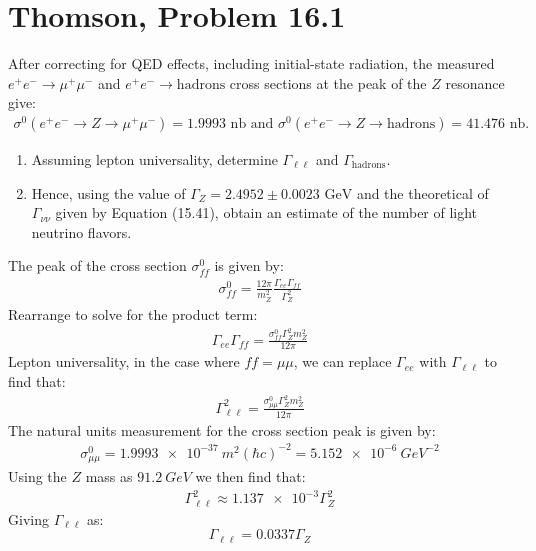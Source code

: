 \documentclass[12pt]{article}
\renewcommand{\l}{\ell}
\begin{document}
\section{Thomson, Problem 16.1}
\begin{problem}
  After correcting for QED effects, including initial-state radiation, the measured $e^+e^-\to\mu^+\mu^-$ and $e^+e^-\to\text{hadrons}$ cross sections at the peak of the $Z$ resonance give:
  \begin{align*}
    \sigma^0(e^+e^-\to Z\to \mu^+\mu^-)=1.9993\text{ nb}\,\,\text{and}\,\,
    \sigma^0(e^+e^-\to Z\to\text{hadrons})=41.476\text{ nb}.
  \end{align*}
  \begin{enumerate}[label = (\alph*)]
  \item Assuming lepton universality, determine $\Gamma_{\l\l}$ and $\Gamma_{\text{hadrons}}$.
  \item Hence, using the value of $\Gamma_Z=2.4952\pm0.0023\text{ GeV}$ and the theoretical of $\Gamma_{\nu\nu}$ given by Equation (15.41), obtain an estimate of the number of light neutrino flavors.
  \end{enumerate}
\end{problem}
The peak of the cross section $\sigma^0_{ff}$ is given by:
\begin{align*}
  \sigma^0_{ff}=\frac{12\pi}{m_Z^2}\frac{\Gamma_{ee}\Gamma_{ff}}{\Gamma_Z^2}
\end{align*}
Rearrange to solve for the product term:
\begin{align*}
  \Gamma_{ee}\Gamma_{ff}=\frac{\sigma_{ff}^0\Gamma_Z^2m_Z^2}{12\pi}
\end{align*}
Lepton universality, in the case where $ff=\mu\mu$, we can replace $\Gamma_{ee}$ with $\Gamma_{\l\l}$ to find that:
\begin{align*}
  \Gamma^2_{\l\l}=\frac{\sigma^0_{\mu\mu}\Gamma_Z^2m_Z^2}{12\pi}
\end{align*}
The natural units measurement for the cross section peak is given by:
\begin{align*}
  \sigma^0_{\mu\mu}=\SI{1.9993e-37}{m^2}(\hbar c)^{-2}=\SI{5.152e-6}{GeV^{-2}}
\end{align*}
Using the $Z$ mass as $\SI{91.2}{GeV}$ we then find that:
\begin{align*}
  \Gamma_{\l\l}^2\approx\num{1.137e-3}\Gamma_{Z}^2
\end{align*}
Giving $\Gamma_{\l\l}$ as:
\begin{equation}
  \label{eq:p3a}
  \boxed{\Gamma_{\l\l}=0.0337\Gamma_Z}
\end{equation}
\end{document}

